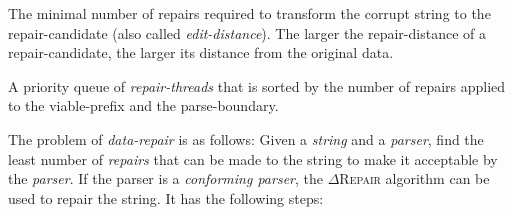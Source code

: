 \documentclass[acmsmall,screen,review,anonymous]{acmart}
\def\Rvalid{\texttt{\color{validcolor}\textbf{$\checkmark$}}\xspace}
\newcommand{\pass}{\text{\Rvalid}\xspace}
\newcommand{\approach}{\textsc{$\Delta$Repair}\xspace}
\newcommand{\drepair}{\approach}
\begin{document}
\begin{description}[labelwidth=!, labelindent=0pt]
\item[repair-distance] The minimal number of repairs required to transform the corrupt
string to the repair-candidate (also called \emph{edit-distance}). The larger the
repair-distance of a repair-candidate, the larger its distance from the original data.

\item[thread-queue] A priority queue of \emph{repair-threads} that is sorted by the
number of repairs applied to the viable-prefix and the parse-boundary.
\end{description}

The problem of \emph{data-repair} is as follows: Given a \emph{string} and a
\emph{parser}, find the least number of \emph{repairs} that can be made to
the string to make it acceptable by the \emph{parser}. If the parser is a
\emph{conforming parser}, the \drepair algorithm can be used to
repair the string. It has the following steps: 

\end{document}
